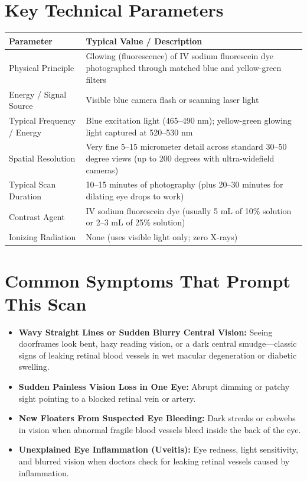 \section{Key Technical Parameters}

\noindent\begin{tabularx}{\textwidth}{@{}l X@{}}
\toprule
\textbf{Parameter} & \textbf{Typical Value / Description} \\
\midrule
Physical Principle & Glowing (fluorescence) of IV sodium fluorescein dye photographed through matched blue and yellow-green filters \\
Energy / Signal Source & Visible blue camera flash or scanning laser light \\
Typical Frequency / Energy & Blue excitation light (465--490 nm); yellow-green glowing light captured at 520--530 nm \\
Spatial Resolution & Very fine 5--15 micrometer detail across standard 30--50 degree views (up to 200 degrees with ultra-widefield cameras) \\
Typical Scan Duration & 10--15 minutes of photography (plus 20--30 minutes for dilating eye drops to work) \\
Contrast Agent & IV sodium fluorescein dye (usually 5 mL of 10\% solution or 2--3 mL of 25\% solution) \\
Ionizing Radiation & None (uses visible light only; zero X-rays) \\
\bottomrule
\end{tabularx}

\section{Common Symptoms That Prompt This Scan}
\begin{itemize}
    \item \textbf{Wavy Straight Lines or Sudden Blurry Central Vision:} Seeing doorframes look bent, hazy reading vision, or a dark central smudge---classic signs of leaking retinal blood vessels in wet macular degeneration or diabetic swelling.
    \item \textbf{Sudden Painless Vision Loss in One Eye:} Abrupt dimming or patchy sight pointing to a blocked retinal vein or artery.
    \item \textbf{New Floaters From Suspected Eye Bleeding:} Dark streaks or cobwebs in vision when abnormal fragile blood vessels bleed inside the back of the eye.
    \item \textbf{Unexplained Eye Inflammation (Uveitis):} Eye redness, light sensitivity, and blurred vision when doctors check for leaking retinal vessels caused by inflammation.
\end{itemize}

